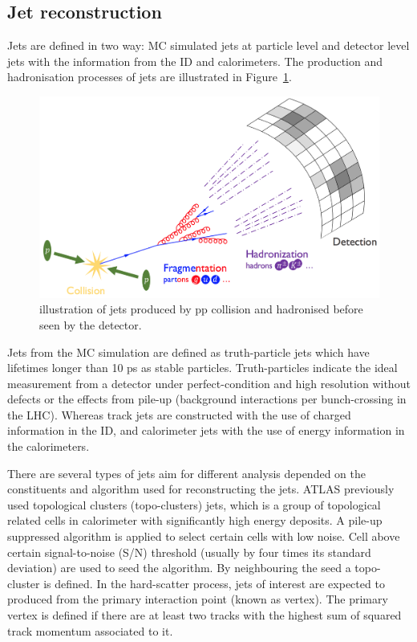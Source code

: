 \subsection{Jet reconstruction}
\label{sec:4.1}

Jets are defined in two way:  MC simulated jets at particle level and detector level jets with the information from the ID and calorimeters. The production and hadronisation processes of jets are illustrated in Figure~\ref{Fig.jet}.

\begin{figure}[htb] 
	\centering  
	\includegraphics[width=15cm]{./fig/jet.jpg}	\caption{illustration of jets produced by pp collision and hadronised before seen by the detector.}
	\label{Fig.jet}
\end{figure}

Jets from the MC simulation are defined as truth-particle jets which have lifetimes longer than 10 ps as stable particles. Truth-particles indicate the ideal measurement from a detector under perfect-condition and high resolution without defects or the effects from pile-up (background interactions per bunch-crossing in the LHC). Whereas track jets are constructed with the use of charged information in the ID, and calorimeter jets with the use of energy information in the calorimeters.

There are several types of jets aim for different analysis depended on the constituents and algorithm used for reconstructing the jets. ATLAS previously used topological clusters (topo-clusters) jets, which is a group of topological related cells in calorimeter with significantly high energy deposits. A pile-up suppressed algorithm is applied to select certain cells with low noise. Cell above certain signal-to-noise (S/N) threshold (usually by four times its standard deviation) are used to seed the algorithm. By neighbouring the seed a topo-cluster is defined. In the hard-scatter process, jets of interest are expected to produced from the primary interaction point (known as vertex). The primary vertex is defined if there are at least two tracks with the highest sum of squared track momentum associated to it.

